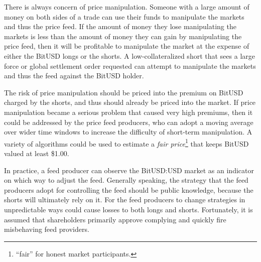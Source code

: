 There is always concern of price manipulation. Someone with a large amount of
money on both sides of a trade can use their funds to manipulate the markets
and thus the price feed. If the amount of money they lose manipulating the
markets is less than the amount of money they can gain by manipulating the
price feed, then it will be profitable to manipulate the market at the expense
of either the BitUSD longs or the shorts. A low-collateralized short that sees
a large force or global settlement order requested can attempt to manipulate
the markets and thus the feed against the BitUSD holder.

The risk of price manipulation should be priced into the premium on BitUSD
charged by the shorts, and thus should already be priced into the market. If
price manipulation became a serious problem that caused very high premiums,
then it could be addressed by the price feed producers, who can adopt a moving
average over wider time windows to increase the difficulty of short-term
manipulation. A variety of algorithms could be used to estimate a \emph{fair
price}\footnote{``fair'' for honest market participants.} that keeps BitUSD
valued at least \$1.00.

In practice, a feed producer can observe the BitUSD:USD market as an indicator
on which way to adjust the feed. Generally speaking, the strategy that the feed
producers adopt for controlling the feed should be public knowledge, because
the shorts will ultimately rely on it. For the feed producers to change
strategies in unpredictable ways could cause losses to both longs and shorts.
Fortunately, it is assumed that shareholders primarily approve complying and
quickly fire misbehaving feed providers.
